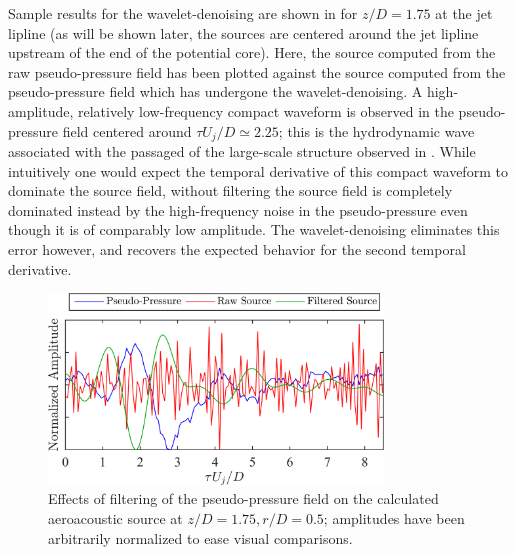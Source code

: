
Sample results for the wavelet-denoising are shown in  for $z/D=1.75$ at the jet lipline (as will be shown later, the sources are centered around the jet lipline upstream of the end of the potential core).
Here, the source computed from the raw pseudo-pressure field has been plotted against the source computed from the pseudo-pressure field which has undergone the wavelet-denoising.
A high-amplitude, relatively low-frequency compact waveform is observed in the pseudo-pressure field centered around $\tau U_j /D \simeq 2.25$; this is the hydrodynamic wave associated with the passaged of the large-scale structure observed in .
While intuitively one would expect the temporal derivative of this compact waveform to dominate the source field, without filtering the source field is completely dominated instead by the high-frequency noise in the pseudo-pressure even though it is of comparably low amplitude.
The wavelet-denoising eliminates this error however, and recovers the expected behavior for the second temporal derivative.
\begin{figure}
	\centering
	\includegraphics[width = 3.5in]{Figures/ch5_valid_denoising.png}
	\caption{Effects of filtering of the pseudo-pressure field on the calculated aeroacoustic source at $z/D = 1.75, r/D = 0.5$; amplitudes have been arbitrarily normalized to ease visual comparisons.}
	\label{fig:valid_denoising}
\end{figure}

